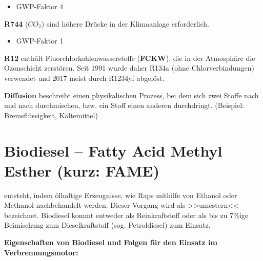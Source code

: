 \begin{itemize}
\item
  GWP-Faktor 4
\end{itemize}

\textbf{R744} ($CO_2$) sind höhere Drücke in der Klimaanlage
erforderlich.

\begin{itemize}
\item
  GWP-Faktor 1
\end{itemize}

\textbf{R12} enthält Fluorchlorkohlenwasserstoffe (\textbf{FCKW}), die
in der Atmosphäre die Ozonschicht zerstören. Seit 1991 wurde daher R134a
(ohne Chlorverbindungen) verwendet und 2017 meist durch R1234yf
abgelöst.

\textbf{Diffusion} beschreibt einen physikalischen Prozess, bei dem sich
zwei Stoffe nach und nach durchmischen, bzw. ein Stoff einen anderen
durchdringt. (Beispiel: Bremsflüssigkeit, Kältemittel)

\section{Biodiesel -- Fatty Acid Methyl Esther (kurz:
FAME)}\label{biodiesel-fatty-acid-methyl-esther-kurz-fame}

entsteht, indem ölhaltige Erzeugnisse, wie Raps mithilfe von Ethanol
oder Methanol nachbehandelt werden. Dieser Vorgang wird als >>umestern<<
bezeichnet. Biodiesel kommt entweder als Reinkraftstoff oder als bis zu
7\%ige Beimischung zum Dieselkraftstoff (sog. Petroldiesel) zum Einsatz.

\textbf{Eigenschaften von Biodiesel und Folgen für den Einsatz im
Verbrennungsmotor:}

